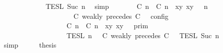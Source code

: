 \begin{isabellebody}
\ \ \ \ \ \ \ \ \ \ {\isasyminter}\ {\isasymlbrakk}{\isasymlbrakk}\ {\isasymPhi}\ {\isasymrbrakk}{\isasymrbrakk}\isactrlsub T\isactrlsub E\isactrlsub S\isactrlsub L\isactrlbsup {\isasymge}\ Suc\ n\isactrlesup {\isacartoucheclose}\ \isamarkupfalse%
\ simp\isanewline
\ \ \isamarkupfalse%
\ \isamarkupfalse%
\ {\isacartoucheopen}{\isasymlbrakk}\ {\isacharparenleft}{\isacharparenleft}{\isasymlceil}{\isacharhash}\isactrlsup {\isasymle}\ C\ n{\isacharcomma}\ {\isacharhash}\isactrlsup {\isasymle}\ C\ n{\isasymrceil}\ {\isasymin}\ {\isacharparenleft}{\isasymlambda}{\isacharparenleft}x{\isacharcomma}y{\isacharparenright}{\isachardot}\ x{\isasymle}y{\isacharparenright}{\isacharparenright}\ {\isacharhash}\ {\isasymGamma}{\isacharparenright}{\isacharcomma}\ n\isanewline
\ \ \ \ \ \ \ \ \ \ \ \ \ \ \ \ \ \ {\isasymTurnstile}\ {\isasymPsi}\ {\isasymtriangleright}\ {\isacharparenleft}{\isacharparenleft}C\ weakly\ precedes\ C\ {\isacharhash}\ {\isasymPhi}{\isacharparenright}\ {\isasymrbrakk}\isactrlsub c\isactrlsub o\isactrlsub n\isactrlsub f\isactrlsub i\isactrlsub g\isanewline
\ \ \ \ \ \ \ \ \ \ \ \ \ \ \ \ {\isacharequal}\ {\isasymlbrakk}{\isasymlbrakk}\ {\isacharparenleft}{\isasymlceil}{\isacharhash}\isactrlsup {\isasymle}\ C\ n{\isacharcomma}\ {\isacharhash}\isactrlsup {\isasymle}\ C\ n{\isasymrceil}\ {\isasymin}\ {\isacharparenleft}{\isasymlambda}{\isacharparenleft}x{\isacharcomma}y{\isacharparenright}{\isachardot}\ x{\isasymle}y{\isacharparenright}{\isacharparenright}\ {\isacharhash}\ {\isasymGamma}\ {\isasymrbrakk}{\isasymrbrakk}\isactrlsub p\isactrlsub r\isactrlsub i\isactrlsub m\isanewline
\ \ \ \ \ \ \ \ \ \ \ \ \ \ \ \ {\isasyminter}\ {\isasymlbrakk}{\isasymlbrakk}\ {\isasymPsi}\ {\isasymrbrakk}{\isasymrbrakk}\isactrlsub T\isactrlsub E\isactrlsub S\isactrlsub L\isactrlbsup {\isasymge}\ n\isactrlesup \ {\isasyminter}\ {\isasymlbrakk}{\isasymlbrakk}\ {\isacharparenleft}C\ weakly\ precedes\ C\ {\isacharhash}\ {\isasymPhi}\ {\isasymrbrakk}{\isasymrbrakk}\isactrlsub T\isactrlsub E\isactrlsub S\isactrlsub L\isactrlbsup {\isasymge}\ Suc\ n\isactrlesup {\isacartoucheclose}\isanewline
\ \ \ \ \isamarkupfalse%
\ simp\isanewline
\ \ \isamarkupfalse%
\ \isamarkupfalse%
\ {\isacharquery}thesis\isanewline
\ \ \isamarkupfalse%

\end{isabellebody}
